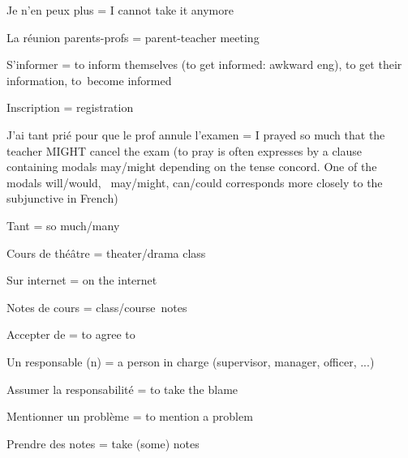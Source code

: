 Je n'en peux plus = I cannot take it anymore~

La réunion parents-profs = parent-teacher meeting~

S'informer = to inform themselves (to get informed: awkward eng), to get
their information, to~become informed~

Inscription = registration~

J'ai tant prié pour que le prof annule l'examen = I prayed so much that
the teacher MIGHT cancel the exam (to pray is often expresses by a
clause containing modals may/might depending on the tense concord. One
of the modals will/would,~ may/might, can/could corresponds more closely
to the subjunctive in French)

Tant = so much/many

Cours de théâtre = theater/drama class

Sur internet = on the internet~

Notes de cours = class/course~notes

Accepter de = to agree to~

Un responsable (n) = a person in charge (supervisor, manager, officer,
...)

Assumer la responsabilité = to take the blame

Mentionner un problème = to mention a problem~

Prendre des notes = take (some) notes~

\hfill\break

 
